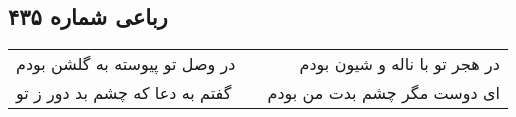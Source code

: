 \begin{center}
\section*{رباعی شماره ۴۳۵}
\label{sec:sh435}
\begin{longtable}{l p{0.5cm} r}
در وصل تو پیوسته به گلشن بودم
&&
در هجر تو با ناله و شیون بودم
\\
گفتم به دعا که چشم بد دور ز تو
&&
ای دوست مگر چشم بدت من بودم
\\
\end{longtable}
\end{center}
